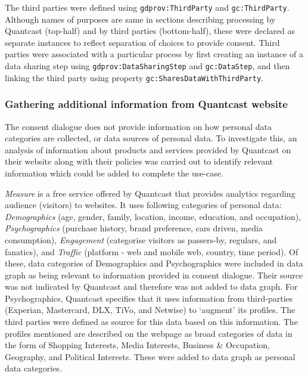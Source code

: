 The third parties were defined using \texttt{gdprov:ThirdParty} and \texttt{gc:ThirdParty}.
Although names of purposes are same in sections describing processing by Quantcast (top-half) and by third parties (bottom-half), these were declared as separate instances to reflect separation of choices to provide consent.
Third parties were associated with a particular process by first creating an instance of a data sharing step using \texttt{gdprov:DataSharingStep} and \texttt{gc:DataStep}, and then linking the third party using property \texttt{gc:SharesDataWithThirdParty}.

\subsubsection{Gathering additional information from Quantcast website}
The consent dialogue does not provide information on how personal data categories are collected, or data sources of personal data. To investigate this, an analysis of information about products and services provided by Quantcast on their website along with their policies was carried out to identify relevant information which could be added to complete the use-case.

\textit{Measure} is a free service offered by Quantcast that provides analytics regarding audience (visitors) to websites. It uses following categories of personal data: \textit{Demographics} (age, gender, family, location, income, education, and occupation), \textit{Psychographics} (purchase history, brand preference, cars driven, media consumption), \textit{Engagement} (categorise visitors as passers-by, regulars, and fanatics), and \textit{Traffic} (platform - web and mobile web, country, time period). Of these, data categories of Demographics and Psychographics were included in data graph as being relevant to information provided in consent dialogue. Their source was not indicated by Quantcast and therefore was not added to  data graph.
For Psychographics, Quantcast specifies that it uses information from third-parties (Experian, Mastercard, DLX, TiVo, and Netwise) to `augment' its profiles. The third parties were defined as source for this data based on this information.
The profiles mentioned are described on the webpage as broad categories of data in the form of Shopping Interests, Media Interests, Business \& Occupation, Geography, and Political Interests. These were added to data graph as personal data categories.

